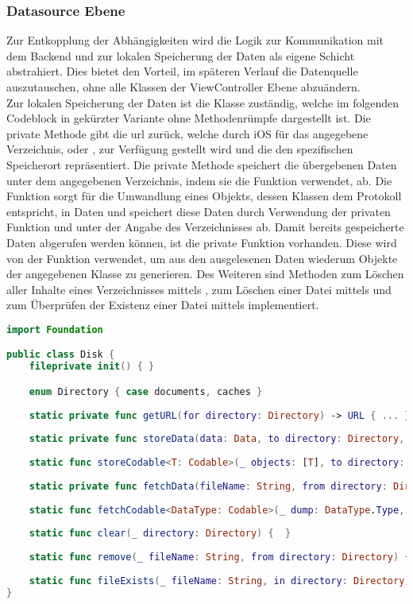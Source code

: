 \clearpage

\subsubsection{Datasource Ebene}
Zur Entkopplung der Abhängigkeiten wird die Logik zur Kommunikation mit dem Backend und zur lokalen Speicherung der Daten als eigene Schicht abstrahiert.
Dies bietet den Vorteil, im späteren Verlauf die Datenquelle auszutauschen, ohne alle Klassen der ViewController Ebene abzuändern.
\\
Zur lokalen Speicherung der Daten ist die Klasse  zuständig, welche im folgenden Codeblock in gekürzter Variante ohne Methodenrümpfe dargestellt ist.
Die private Methode  gibt die \gls{url} zurück, welche durch iOS für das angegebene Verzeichnis,  oder , zur Verfügung gestellt wird und die den spezifischen Speicherort repräsentiert.
Die private Methode  speichert die übergebenen Daten unter dem angegebenen Verzeichnis, indem sie die Funktion  verwendet, ab.
Die Funktion   sorgt für die Umwandlung eines Objekts, dessen Klassen dem  Protokoll entspricht, in Daten und speichert diese Daten durch Verwendung der privaten Funktion  und unter der Angabe des Verzeichnisses ab.
Damit bereits gespeicherte Daten abgerufen werden können, ist die private Funktion  vorhanden. Diese wird von der Funktion  verwendet, um aus den ausgelesenen Daten wiederum Objekte der angegebenen Klasse zu generieren.
Des Weiteren sind Methoden zum Löschen aller Inhalte eines Verzeichnisses mittels , zum Löschen einer Datei mittels  und zum Überprüfen der Existenz einer Datei mittels  implementiert.

\begin{lstlisting}[language=Swift]
import Foundation

public class Disk {
    fileprivate init() { }

    enum Directory { case documents, caches }
    
    static private func getURL(for directory: Directory) -> URL { ... }
    
    static private func storeData(data: Data, to directory: Directory, as fileName: String) { ... }
    
    static func storeCodable<T: Codable>(_ objects: [T], to directory: Directory, as fileName: String) { ... }
    
    static private func fetchData(fileName: String, from directory: Directory) -> Data { ... }
    
    static func fetchCodable<DataType: Codable>(_ dump: DataType.Type, fileName: String, from directory: Directory) -> [DataType]? { ...  }
    
    static func clear(_ directory: Directory) {  }
    
    static func remove(_ fileName: String, from directory: Directory) { ... }
    
    static func fileExists(_ fileName: String, in directory: Directory) -> Bool { ... }
}
\end{lstlisting}

